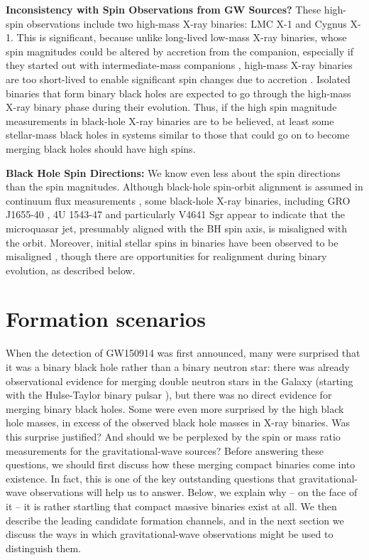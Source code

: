 \documentclass[iop,onecolumn]{revtex4}
\begin{document}
\textbf{Inconsistency with Spin Observations from GW Sources?} These high-spin observations include two high-mass X-ray binaries: LMC X-1 and Cygnus X-1.  This is significant, because unlike long-lived low-mass X-ray binaries, whose spin magnitudes could be altered by accretion from the companion, especially if they started out with intermediate-mass companions \citep{Podsiadlowski:2003,Fragos:2015}, high-mass X-ray binaries are too short-lived to enable significant spin changes due to accretion \citep{KingKolb:1999}.  Isolated binaries that form binary black holes are expected to go through the high-mass X-ray binary phase during their evolution.  Thus, if the high spin magnitude measurements in black-hole X-ray binaries are to be believed, at least some stellar-mass black holes in systems similar to those that could go on to become merging black holes should have high spins.  

\textbf{Black Hole Spin Directions:} We know even less about the spin directions than the spin magnitudes.  Although black-hole spin-orbit alignment is assumed in continuum flux measurements \citep{MillerMiller:2015}, some black-hole X-ray binaries, including GRO J1655-40 \citep{Martin:2008}, 4U 1543-47 \citep{MorningstarMiller:2014} and particularly V4641 Sgr \citep{Orosz:2001,Martin:2008b} appear to indicate that the microquasar jet, presumably aligned with the BH spin axis, is misaligned with the orbit.  Moreover, initial stellar spins in binaries have been observed to be misaligned \citep[e.g.,][]{Albrecht:2009,Albrecht:2014}, though there are opportunities for realignment during binary evolution, as described below.

\section{Formation scenarios}\label{form}

When the detection of GW150914 was first announced, many were surprised that it was a binary black hole rather than a binary neutron star: there was already observational evidence for merging double neutron stars in the Galaxy (starting with the Hulse-Taylor binary pulsar \citep{HulseTaylor:1975}), but there was no direct evidence for merging binary black holes. Some were even more surprised by the high black hole masses, in excess of the observed black hole masses in X-ray binaries. Was this surprise justified? And should we be perplexed by the spin or mass ratio measurements for the gravitational-wave sources? Before answering these questions, we should first discuss how these merging compact binaries come into existence. In fact, this is one of the key outstanding questions that gravitational-wave observations will help us to answer. Below, we explain why -- on the face of it -- it is rather startling that compact massive binaries exist at all. We then describe the leading candidate formation channels, and in the next section we discuss the ways in which gravitational-wave observations might be used to distinguish them.
\end{document}
